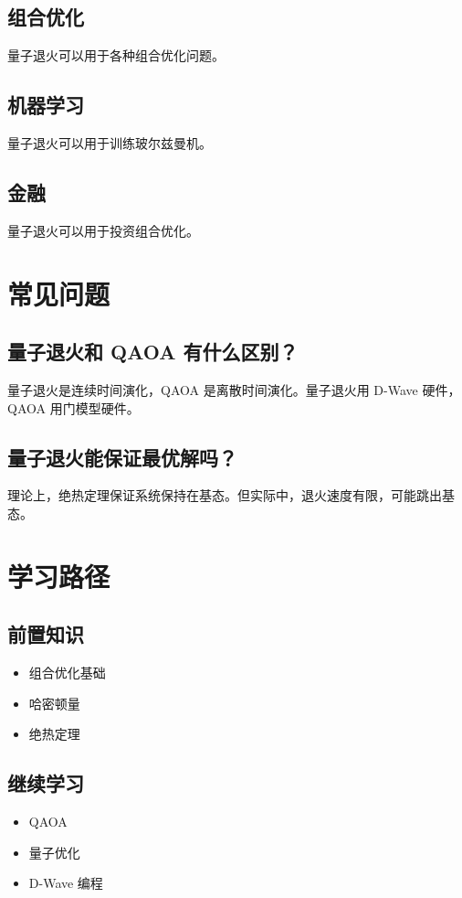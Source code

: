 \documentclass[12pt,a4paper]{article}
\begin{document}
\subsection{组合优化}

量子退火可以用于各种组合优化问题。

\subsection{机器学习}

量子退火可以用于训练玻尔兹曼机。

\subsection{金融}

量子退火可以用于投资组合优化。

\section{常见问题}

\subsection{量子退火和 QAOA 有什么区别？}

量子退火是连续时间演化，QAOA 是离散时间演化。量子退火用 D-Wave 硬件，QAOA 用门模型硬件。

\subsection{量子退火能保证最优解吗？}

理论上，绝热定理保证系统保持在基态。但实际中，退火速度有限，可能跳出基态。

\section{学习路径}

\subsection{前置知识}
\begin{itemize}
  \item 组合优化基础
  \item 哈密顿量
  \item 绝热定理
\end{itemize}

\subsection{继续学习}
\begin{itemize}
  \item QAOA
  \item 量子优化
  \item D-Wave 编程
\end{itemize}
\end{document}
